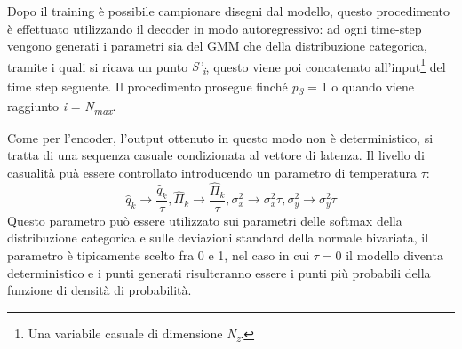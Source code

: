 Dopo il training è possibile campionare disegni dal modello, questo procedimento è effettuato utilizzando il decoder in modo autoregressivo: ad ogni time-step vengono generati i parametri sia del GMM che della distribuzione categorica, tramite i quali si ricava un punto \textit{S'\textsubscript{i}}, questo viene poi concatenato all'input\footnote{Una variabile casuale di dimensione \textit{N\textsubscript{z}}.} del time step seguente. Il procedimento prosegue finché \textit{p\textsubscript{3}} = 1 o quando viene raggiunto \textit{i} = \textit{N\textsubscript{max}}.

Come per l'encoder, l'output ottenuto in questo modo non è deterministico, si tratta di una sequenza casuale condizionata al vettore di latenza. Il livello di casualità puà essere controllato introducendo un parametro di temperatura $\tau$:
\begin{equation}
	\label{temperature}
	\hat q_k \rightarrow \frac{\hat q_k}{\tau}, \hat \Pi_k \rightarrow \frac{\hat \Pi_k}{\tau}, \sigma_x^2 \rightarrow \sigma_x^2 \tau, \sigma_y^2 \rightarrow \sigma_y^2 \tau
\end{equation}
Questo parametro può essere utilizzato sui parametri delle softmax della distribuzione categorica e sulle deviazioni standard della normale bivariata, il parametro è tipicamente scelto fra 0 e 1, nel caso in cui $\tau = 0$ il modello diventa deterministico e i punti generati risulteranno essere i punti più probabili della funzione di densità di probabilità.
